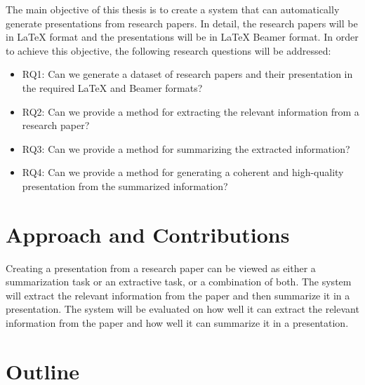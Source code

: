 The main objective of this thesis is to create a system that can automatically generate presentations from research papers. In detail, the research papers will be in LaTeX format and the presentations will be in LaTeX Beamer format. In order to achieve this objective, the following research questions will be addressed:

\begin{itemize}
  \item RQ1: Can we generate a dataset of research papers and their presentation in the required LaTeX and Beamer formats?
  \item RQ2: Can we provide a method for extracting the relevant information from a research paper?
  \item RQ3: Can we provide a method for summarizing the extracted information?
  \item RQ4: Can we provide a method for generating a coherent and high-quality presentation from the summarized information?
\end{itemize}

\section{Approach and Contributions}
\label{sec:intro:approach}


Creating a presentation from a research paper can be viewed as either a summarization task or an extractive task, or a combination of both. The system will extract the relevant information from the paper and then summarize it in a presentation. The system will be evaluated on how well it can extract the relevant information from the paper and how well it can summarize it in a presentation.

\section{Outline}
\label{sec:intro:outline}


